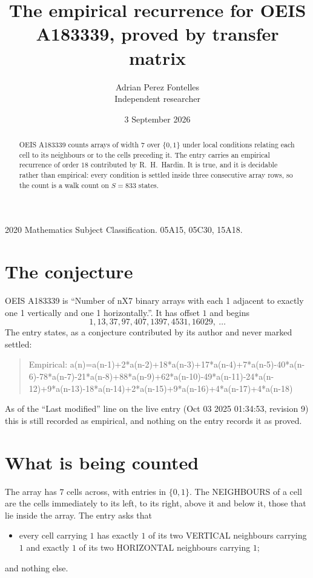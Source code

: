 \documentclass[11pt,a4paper]{article}
\title{The empirical recurrence for OEIS A183339, proved by transfer matrix}
\author{Adrian Perez Fontelles\\ \small Independent researcher}
\date{3 September 2026}
\theoremstyle{plain}
\theoremstyle{definition}
\begin{document}
\maketitle

\begin{abstract}
OEIS A183339 counts arrays of width $7$ over $\{0,1\}$ under local conditions relating each cell
to its neighbours or to the cells preceding it. The entry carries an empirical recurrence of
order $18$ contributed by R.~H.~Hardin. It is true, and it is decidable rather than
empirical: every condition is settled inside three consecutive array rows, so the count is a
walk count on $S=833$ states.
\end{abstract}

\noindent\small 2020 Mathematics Subject Classification. 05A15, 05C30, 15A18.\normalsize

\section{The conjecture}

OEIS A183339 is ``Number of nX7 binary arrays with each 1 adjacent to exactly one 1 vertically and one 1 horizontally.''. It has offset $1$ and begins
\[
1, 13, 37, 97, 407, 1397, 4531, 16029,\ \dots
\]
The entry states, as a conjecture contributed by its author and never marked settled:
\begin{quote}
Empirical: a(n)=a(n-1)+2*a(n-2)+18*a(n-3)+17*a(n-4)+7*a(n-5)-40*a(n-6)-78*a(n-7)-21*a(n-8)+88*a(n-9)+62*a(n-10)-49*a(n-11)-24*a(n-12)+9*a(n-13)-18*a(n-14)+2*a(n-15)+9*a(n-16)+4*a(n-17)+4*a(n-18)
\end{quote}
As of the ``Last modified'' line on the live entry (Oct 03 2025 01:34:53, revision 9) this is still
recorded as empirical, and nothing on the entry records it as proved.

\section{What is being counted}

The array has $7$ cells across, with entries in $\{0,1\}$. The NEIGHBOURS of a cell are the
cells immediately to its left, to its right, above it and below it, those that lie inside the
array. The entry asks that
\begin{itemize}
\item every cell carrying $1$ has exactly $1$ of its two VERTICAL neighbours carrying $1$ and exactly $1$ of its two HORIZONTAL neighbours carrying $1$;
\end{itemize}
and nothing else.
\end{document}
